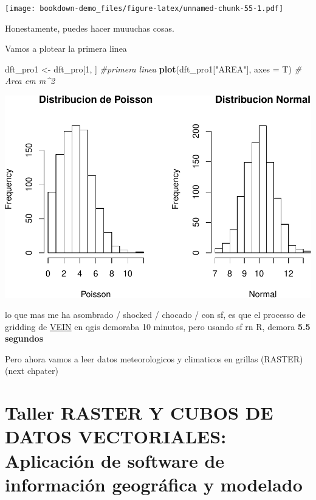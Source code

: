 \documentclass[]{book}
\newenvironment{Shaded}{\begin{snugshade}}{\end{snugshade}}
\newcommand{\CommentTok}[1]{\textcolor[rgb]{0.56,0.35,0.01}{\textit{#1}}}
\newcommand{\DataTypeTok}[1]{\textcolor[rgb]{0.13,0.29,0.53}{#1}}
\newcommand{\DecValTok}[1]{\textcolor[rgb]{0.00,0.00,0.81}{#1}}
\newcommand{\KeywordTok}[1]{\textcolor[rgb]{0.13,0.29,0.53}{\textbf{#1}}}
\newcommand{\NormalTok}[1]{#1}
\newcommand{\StringTok}[1]{\textcolor[rgb]{0.31,0.60,0.02}{#1}}
\begin{document}
\texttt{[image: bookdown-demo\_files/figure-latex/unnamed-chunk-55-1.pdf]}

Honestamente, puedes hacer muuuchas cosas.

Vamos a plotear la primera linea

\begin{Shaded}
\begin{Highlighting}[]
\NormalTok{dft_pro1 <-}\StringTok{ }\NormalTok{dft_pro[}\DecValTok{1}\NormalTok{, ] }\CommentTok{#primera linea}
\KeywordTok{plot}\NormalTok{(dft_pro1[}\StringTok{"AREA"}\NormalTok{], }\DataTypeTok{axes =}\NormalTok{ T) }\CommentTok{# Area em m^2}
\end{Highlighting}
\end{Shaded}

\includegraphics{bookdown-demo_files/figure-latex/unnamed-chunk-56-1.pdf}

lo que mas me ha asombrado / shocked / chocado / con sf, es que el processo de gridding de \href{https://rdrr.io/cran/vein/man/emis_grid.html}{VEIN} en qgis demoraba 10 minutos, pero usando sf rn R, demora \textbf{5.5 segundos}

Pero ahora vamos a leer datos meteorologicos y climaticos en grillas (RASTER)
(next chpater)

\hypertarget{taller-raster-y-cubos-de-datos-vectoriales-aplicacion-de-software-de-informacion-geografica-y-modelado}{%
\chapter{Taller RASTER Y CUBOS DE DATOS VECTORIALES: Aplicación de software de información geográfica y modelado}\label{taller-raster-y-cubos-de-datos-vectoriales-aplicacion-de-software-de-informacion-geografica-y-modelado}}
\end{document}
